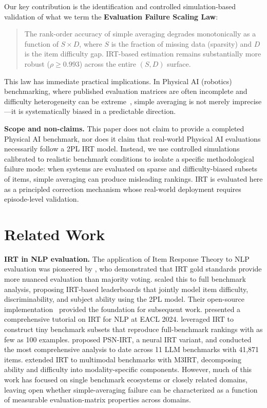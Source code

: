 \documentclass[11pt,a4paper]{article}
\begin{document}
Our key contribution is the identification and controlled simulation-based validation of what we term the \textbf{Evaluation Failure Scaling Law}:

\begin{quote}
The rank-order accuracy of simple averaging degrades monotonically as a function of $S \times D$, where $S$ is the fraction of missing data (sparsity) and $D$ is the item difficulty gap. IRT-based estimation remains substantially more robust ($\rho \geq 0.993$) across the entire $(S, D)$ surface.
\end{quote}

This law has immediate practical implications. In Physical AI (robotics) benchmarking, where published evaluation matrices are often incomplete and difficulty heterogeneity can be extreme~\cite{zhou2025b,liu2023libero}, simple averaging is not merely imprecise---it is systematically biased in a predictable direction.

\textbf{Scope and non-claims.} This paper does not claim to provide a completed Physical AI benchmark, nor does it claim that real-world Physical AI evaluations necessarily follow a 2PL IRT model. Instead, we use controlled simulations calibrated to realistic benchmark conditions to isolate a specific methodological failure mode: when systems are evaluated on sparse and difficulty-biased subsets of items, simple averaging can produce misleading rankings. IRT is evaluated here as a principled correction mechanism whose real-world deployment requires episode-level validation.

\section{Related Work}

\textbf{IRT in NLP evaluation.} The application of Item Response Theory to NLP evaluation was pioneered by \citet{lalor2016}, who demonstrated that IRT gold standards provide more nuanced evaluation than majority voting. \citet{rodriguez2021} scaled this to full benchmark analysis, proposing IRT-based leaderboards that jointly model item difficulty, discriminability, and subject ability using the 2PL model. Their open-source implementation~\cite{rodriguez2021b} provided the foundation for subsequent work. \citet{lalor2024} presented a comprehensive tutorial on IRT for NLP at EACL 2024. \citet{polo2024} leveraged IRT to construct tiny benchmark subsets that reproduce full-benchmark rankings with as few as 100 examples. \citet{zhou2025a} proposed PSN-IRT, a neural IRT variant, and conducted the most comprehensive analysis to date across 11 LLM benchmarks with 41,871 items. \citet{chen2026} extended IRT to multimodal benchmarks with M3IRT, decomposing ability and difficulty into modality-specific components. However, much of this work has focused on single benchmark ecosystems or closely related domains, leaving open whether simple-averaging failure can be characterized as a function of measurable evaluation-matrix properties across domains.
\end{document}
